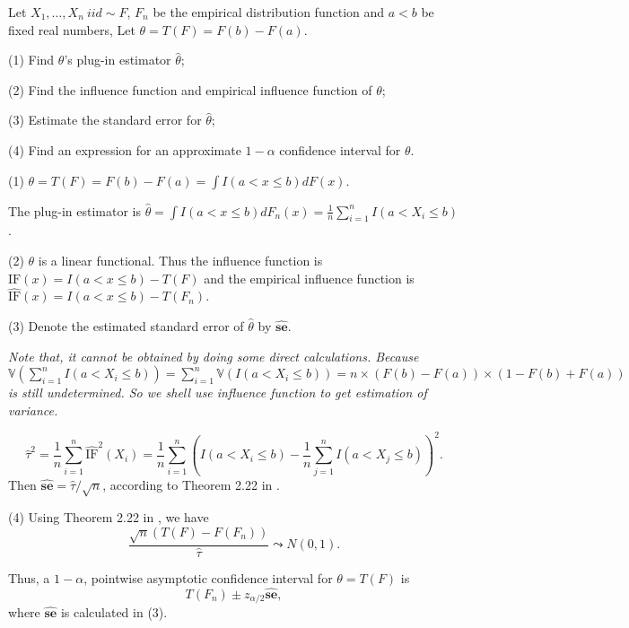 \begin{problem}
    Let $X_1,\ldots,X_n~iid\sim F$, $F_n$ be the empirical distribution function and $a<b$ be fixed real numbers, Let $\theta=T(F)=F(b)-F(a)$.  

    (1) Find $\theta$'s plug-in estimator $\hat\theta$;

    (2) Find the influence function and empirical influence function of $\theta$;

    (3) Estimate the standard error for $\hat\theta$;

    (4) Find an expression for an approximate $1-\alpha$ confidence interval for $\theta$. 
\end{problem}

\begin{solution}
    (1) $\theta = T(F) = F(b) - F(a) = \int I(a < x \le b) dF(x)$.

    The plug-in estimator is $\hat{\theta} =  \int I(a < x \le b) d F_n(x) = \frac{1}{n}\sum_{i=1}^n I(a < X_i \le b)$.

    (2) $\theta$ is a linear functional. Thus the influence function is $\text{IF}(x) = I(a < x \le b) - T(F)$ and the empirical influence function is  $\widehat{\text{IF}}(x) = I(a < x \le b) - T(F_n)$.

    (3) Denote the estimated standard error of $\hat{\theta}$ by  $\widehat{\textbf{se}}$. 

    \small{\emph{Note that, it cannot be obtained by doing some direct calculations. Because $\mathbb{V} \left( \sum_{i=1}^n I(a < X_i \le b) \right) = \sum_{i=1}^n \mathbb{V} (I(a < X_i \le b)) = n \times (F(b)-F(a)) \times (1-F(b)+F(a))$ is still undetermined. So we shell use influence function to get estimation of variance.}}
    
    \begin{equation*}
        \hat{\tau}^2 = \frac{1}{n} \sum_{i=1}^n \widehat{\text{IF}}^2 (X_i) =  \frac{1}{n} \sum_{i=1}^n \left(I(a < X_i \le b) -  \frac{1}{n}\sum_{j=1}^n I(a < X_j \le b) \right)^2 .
    \end{equation*}
    Then $\widehat{\textbf{se}} = \hat{\tau}/\sqrt{n}$, according to Theorem 2.22 in \citet{Wasserman2006All}.

    (4) Using Theorem 2.22 in \citet{Wasserman2006All}, we have 
    \begin{equation*}
        \frac{\sqrt{n} ( T(F) - F(F_n))}{\hat{\tau}} \leadsto N(0, 1).
    \end{equation*}
    
    Thus, a $1-\alpha$, pointwise asymptotic confidence interval for $\theta = T(F)$ is
    \begin{equation*}
        T(F_n) \pm z_{\alpha/2} \widehat{\textbf{se}} ,
    \end{equation*}
    where $\widehat{\textbf{se}}$ is calculated in (3).
\end{solution}




